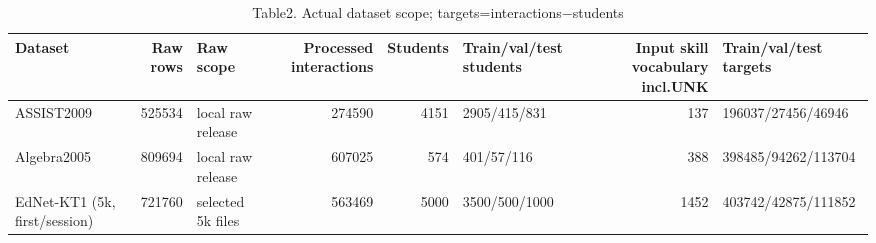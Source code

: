 \begin{table}
\caption{Table2. Actual dataset scope; targets=interactions−students}
\begin{tabular}{lrlrrlrl}
\toprule
Dataset & Raw rows & Raw scope & Processed interactions & Students & Train/val/test students & Input skill vocabulary incl.UNK & Train/val/test targets \\
\midrule
ASSIST2009 & 525534 & local raw release & 274590 & 4151 & 2905/415/831 & 137 & 196037/27456/46946 \\
Algebra2005 & 809694 & local raw release & 607025 & 574 & 401/57/116 & 388 & 398485/94262/113704 \\
EdNet-KT1 (5k, first/session) & 721760 & selected 5k files & 563469 & 5000 & 3500/500/1000 & 1452 & 403742/42875/111852 \\
\bottomrule
\end{tabular}
\end{table}
